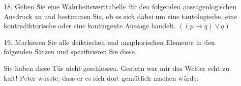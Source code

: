 \begin{frame}
	
\begin{itemize}
		
	\item[18.] Geben Sie eine Wahrheitswerttabelle für den folgenden aussagenlogischen Ausdruck an und bestimmen Sie, ob es sich dabei um eine tautologische, eine kontradiktorische oder eine kontingente Aussage handelt.
		\ea $((p \rightarrow q) \lor q)$
		\z
		
		\begin{table}
			\centering
		\end{table}

\medskip
	
				
\end{itemize}
	
\end{frame}


\begin{frame}

\begin{itemize}
		\item[19.] Markieren Sie alle deiktischen und anaphorischen Elemente in den folgenden Sätzen und spezifizieren Sie diese.
		
	\eal
	\ex Sie haben diese Tür nicht geschlossen.
	\ex Gestern war mir das Wetter echt zu kalt!
	\ex Peter wusste, dass er es sich dort gemütlich machen würde.
	\zl

\end{itemize}

\end{frame}


